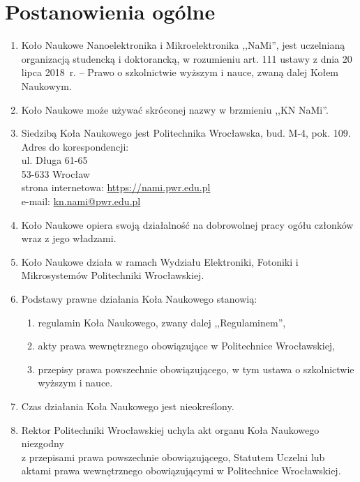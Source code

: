 \documentclass[12pt,a4paper]{article}
\begin{document}
\section{Postanowienia ogólne}
    \begin{enumerate}
        \item Koło Naukowe Nanoelektronika i Mikroelektronika ,,NaMi'', jest uczelnianą organizacją studencką i doktorancką, w rozumieniu art. 111 ustawy z dnia 20 lipca 2018~r. – Prawo o szkolnictwie wyższym i nauce, zwaną dalej Kołem Naukowym.
        \item Koło Naukowe może używać skróconej nazwy w brzmieniu ,,KN NaMi''.
        \item Siedzibą Koła Naukowego jest Politechnika Wrocławska, bud. M-4, pok. 109. \\
        Adres do korespondencji: \\
        ul. Długa 61-65 \\
        53-633 Wrocław \\
        strona internetowa: \url{https://nami.pwr.edu.pl} \\
        e-mail: \href{mailto:kn.nami@pwr.edu.pl}{kn.nami@pwr.edu.pl}

        \item Koło Naukowe opiera swoją działalność na dobrowolnej pracy ogółu członków wraz z jego władzami.
        \item Koło Naukowe działa w ramach Wydziału Elektroniki, Fotoniki i Mikrosystemów Politechniki Wrocławskiej.
        \item Podstawy prawne działania Koła Naukowego stanowią:
            \begin{enumerate}
                \item regulamin Koła Naukowego, zwany dalej ,,Regulaminem'',
                \item akty prawa wewnętrznego obowiązujące w Politechnice Wrocławskiej,
                \item przepisy prawa powszechnie obowiązującego, w tym ustawa o szkolnictwie wyższym i nauce.
            \end{enumerate}
        \item Czas działania Koła Naukowego jest nieokreślony.
        \item Rektor Politechniki Wrocławskiej uchyla akt organu Koła Naukowego niezgodny \\ z przepisami prawa powszechnie obowiązującego, Statutem Uczelni lub aktami prawa wewnętrznego obowiązującymi w Politechnice Wrocławskiej.
    \end{enumerate}
\end{document}

